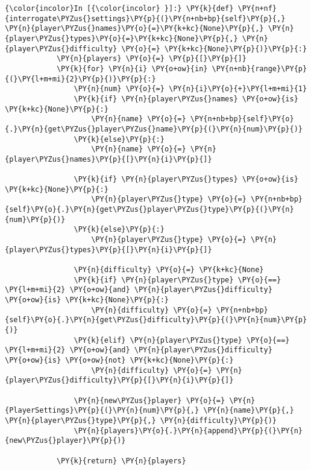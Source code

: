     \begin{Verbatim}[commandchars=\\\{\}]
{\color{incolor}In [{\color{incolor} }]:} \PY{k}{def} \PY{n+nf}{interrogate\PYZus{}settings}\PY{p}{(}\PY{n+nb+bp}{self}\PY{p}{,} \PY{n}{player\PYZus{}names}\PY{o}{=}\PY{k+kc}{None}\PY{p}{,} \PY{n}{player\PYZus{}types}\PY{o}{=}\PY{k+kc}{None}\PY{p}{,} \PY{n}{player\PYZus{}difficulty} \PY{o}{=} \PY{k+kc}{None}\PY{p}{)}\PY{p}{:}
            \PY{n}{players} \PY{o}{=} \PY{p}{[}\PY{p}{]}
            \PY{k}{for} \PY{n}{i} \PY{o+ow}{in} \PY{n+nb}{range}\PY{p}{(}\PY{l+m+mi}{2}\PY{p}{)}\PY{p}{:}
                \PY{n}{num} \PY{o}{=} \PY{n}{i}\PY{o}{+}\PY{l+m+mi}{1}
                \PY{k}{if} \PY{n}{player\PYZus{}names} \PY{o+ow}{is} \PY{k+kc}{None}\PY{p}{:}
                    \PY{n}{name} \PY{o}{=} \PY{n+nb+bp}{self}\PY{o}{.}\PY{n}{get\PYZus{}player\PYZus{}name}\PY{p}{(}\PY{n}{num}\PY{p}{)}
                \PY{k}{else}\PY{p}{:}
                    \PY{n}{name} \PY{o}{=} \PY{n}{player\PYZus{}names}\PY{p}{[}\PY{n}{i}\PY{p}{]}
        
                \PY{k}{if} \PY{n}{player\PYZus{}types} \PY{o+ow}{is} \PY{k+kc}{None}\PY{p}{:}
                    \PY{n}{player\PYZus{}type} \PY{o}{=} \PY{n+nb+bp}{self}\PY{o}{.}\PY{n}{get\PYZus{}player\PYZus{}type}\PY{p}{(}\PY{n}{num}\PY{p}{)}
                \PY{k}{else}\PY{p}{:}
                    \PY{n}{player\PYZus{}type} \PY{o}{=} \PY{n}{player\PYZus{}types}\PY{p}{[}\PY{n}{i}\PY{p}{]}
        
                \PY{n}{difficulty} \PY{o}{=} \PY{k+kc}{None}
                \PY{k}{if} \PY{n}{player\PYZus{}type} \PY{o}{==} \PY{l+m+mi}{2} \PY{o+ow}{and} \PY{n}{player\PYZus{}difficulty} \PY{o+ow}{is} \PY{k+kc}{None}\PY{p}{:}
                    \PY{n}{difficulty} \PY{o}{=} \PY{n+nb+bp}{self}\PY{o}{.}\PY{n}{get\PYZus{}difficulty}\PY{p}{(}\PY{n}{num}\PY{p}{)}
                \PY{k}{elif} \PY{n}{player\PYZus{}type} \PY{o}{==} \PY{l+m+mi}{2} \PY{o+ow}{and} \PY{n}{player\PYZus{}difficulty} \PY{o+ow}{is} \PY{o+ow}{not} \PY{k+kc}{None}\PY{p}{:}
                    \PY{n}{difficulty} \PY{o}{=} \PY{n}{player\PYZus{}difficulty}\PY{p}{[}\PY{n}{i}\PY{p}{]}
        
                \PY{n}{new\PYZus{}player} \PY{o}{=} \PY{n}{PlayerSettings}\PY{p}{(}\PY{n}{num}\PY{p}{,} \PY{n}{name}\PY{p}{,} \PY{n}{player\PYZus{}type}\PY{p}{,} \PY{n}{difficulty}\PY{p}{)}
                \PY{n}{players}\PY{o}{.}\PY{n}{append}\PY{p}{(}\PY{n}{new\PYZus{}player}\PY{p}{)}
        
            \PY{k}{return} \PY{n}{players}
\end{Verbatim}


